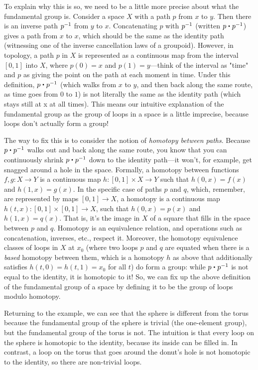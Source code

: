 To explain why this is so, we need to be a little more precise about
what the fundamental group is.  Consider a space $X$ with a path $p$
from $x$ to $y$.  Then there is an inverse path $\mathord{{p}^{-1}}$ from $y$ to
$x$.  Concatenating $p$ with $\mathord{{p}^{-1}}$ (written $p \ct \opp p$) gives a
path from $x$ to $x$, which should be the same as the identity path
(witnessing one of the inverse cancellation laws of a groupoid).
However, in topology, a path $p$ in $X$ is represented as a continuous
map from the interval $[0,1]$ into $X$, where $p(0) = x$ and $p(1) =
y$---think of the interval as "time" and $p$ as giving the point on the
path at each moment in time.  Under this definition, $p \ct \opp p$
(which walks from $x$ to $y$, and then back along the same route, as
time goes from $0$ to $1$) is not literally the same as the identity
path (which stays still at x at all times).  This means our intuitive
explanation of the fundamental group as the group of loops in a space is
a little imprecise, because loops don't actually form a group!

The way to fix this is to consider the notion of \emph{homotopy between
paths}. Because $p \ct \opp p$ walks out and back along the same route, you know
that you can continuously shrink $p \ct \opp p$ down to the identity path---it
won't, for example, get snagged around a hole in the space.  Formally, a
homotopy between functions $f, g : X \rightarrow Y$ is a continuous map 
$h : [0,1] \times X \rightarrow Y$ such that $h(0,x) = f(x)$ and $h(1,x) = g(x)$.  In the specific case
of paths $p$ and $q$, which, remember, are represented by maps $[0,1] \rightarrow X$, a
homotopy is a continuous map $h(t,x) : [0,1] \times [0,1] \rightarrow X$, such that
$h(0,x) = p(x)$ and $h(1,x) = q(x)$.  That is, it's the image in $X$ of a
square that fills in the space between $p$ and $q$.  Homotopy is an
equivalence relation, and operations such as concatenation, inverses,
etc., respect it.  Moreover, the homotopy equivalence classes of loops in
$X$ at $x_0$ (where two loops $p$ and $q$ are equated when there is a \emph{based}
homotopy between them, which is a homotopy $h$ as above that additionally
satisfies $h(t,0) = h(t,1) = x_0$ for all $t$) do form a group: while $p \ct \opp p$
is not equal to the identity, it is homotopic to it!  So, we can fix up
the above definition of the fundamental group of a space by defining it
to be the group of loops modulo homotopy.

Returning to the example, we can see that the sphere is different from
the torus because the fundamental group of the sphere is trivial (the
one-element group), but the fundamental group of the torus is not.  The
intuition is that every loop on the sphere is homotopic to the identity,
because its inside can be filled in.  In contrast, a loop on the torus that
goes around the donut's hole is not homotopic to the identity, so there
are non-trivial loops.

